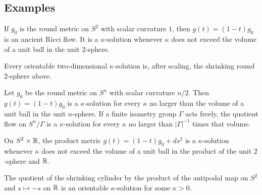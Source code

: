 \subsection{Examples}

\begin{example}\label{ex:shrinking-sphere-kappa-solution}

If $g_0$ is the round metric on $S^2$ with scalar curvature $1$, then
$g(t)=(1-t)g_0$ is an ancient Ricci flow. It is a $\kappa$-solution
whenever $\kappa$ does not exceed the volume of a unit ball in the
unit $2$-sphere.
\end{example}

\begin{theorem}\label{thm:two-dimensional-kappa-solution-preview}

Every orientable two-dimensional $\kappa$-solution is, after scaling,
the shrinking round $2$-sphere above.
\end{theorem}

\begin{example}\label{ex:round-sphere-quotient-kappa-solution}

Let $g_0$ be the round metric on $S^n$ with scalar curvature $n/2$.
Then $g(t)=(1-t)g_0$ is a $\kappa$-solution for every $\kappa$ no
larger than the volume of a unit ball in the unit $n$-sphere. If a
finite isometry group $\Gamma$ acts freely, the quotient flow on
$S^n/\Gamma$ is a $\kappa$-solution for every $\kappa$ no larger than
$|\Gamma|^{-1}$ times that volume.
\end{example}

\begin{example}\label{ex:cylinder-kappa-solution}

On $S^2\times\mathbb{R}$, the product metric
$g(t)=(1-t)g_0+ds^2$ is a $\kappa$-solution whenever $\kappa$ does
not exceed the volume of a unit ball in the product of the unit
$2$-sphere and $\mathbb{R}$.
\end{example}

\begin{example}\label{ex:cylinder-quotient-kappa-solution}

The quotient of the shrinking cylinder by the product of the
antipodal map on $S^2$ and $s\mapsto-s$ on $\mathbb{R}$ is an orientable
$\kappa$-solution for some $\kappa>0$.
\end{example}

